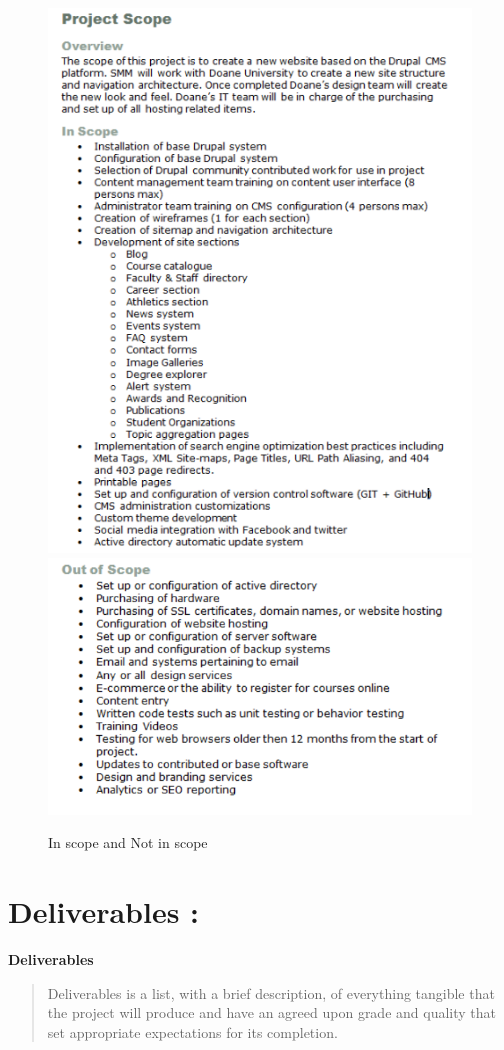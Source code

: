 \documentclass{article}
\begin{document}
\begin{figure}[H]
	\centering
	\includegraphics[scale=0.3]{Scope1.png}
	\includegraphics[scale=0.3]{!Scope1.png}
	\caption{In scope and Not in scope}
\end{figure}


\section{Deliverables :}
\textbf{Deliverables}
\begin{quote}
Deliverables is a list, with a brief description, of everything tangible that the project will produce and have an agreed upon grade and quality that set appropriate expectations for its completion.
\end{quote}
\end{document}
